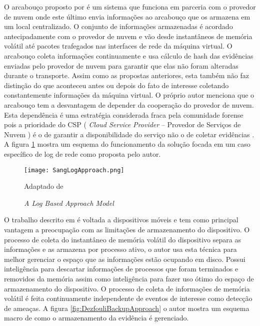 O arcabouço proposto por \cite{SangLogApproach:2013} é um sistema que funciona em parceria com o provedor de nuvem onde este último envia informações ao arcabouço que os armazena em um local centralizado.
%
O conjunto de informações armazenadas é acordado antecipadamente com o provedor de nuvem e vão desde instantâneos de memória volátil até pacotes trafegados nas interfaces de rede da máquina virtual.
%
O arcabouço coleta informações continuamente e usa cálculo de hash das evidências enviadas pelo provedor de nuvem para garantir que elas não foram alteradas durante o transporte.
%
Assim como as propostas anteriores, esta também não faz distinção do que aconteceu antes ou depois do fato de interesse coletando constantemente informações da máquina virtual.
%
O próprio autor menciona que o arcabouço tem a desvantagem de depender da cooperação do provedor de nuvem. Esta dependência é uma estratégia considerada fraca pela comunidade forense pois a prioridade do CSP ( \textit{Cloud Service Provider} -- Provedor de Serviços de Nuvem ) é o de garantir a disponibilidade do serviço não o de coletar evidências \cite{ClarkeReviewOfChallenges2015}.
%
A figura \ref{fig:SangLogApproach} mostra um esquema do funcionamento da solução focada em um caso específico de log de rede como proposta pelo autor.

\begin{figure}[htb!]
\footnotesize
\caption{\textit{A Log Based Approach Model}}
\texttt{[image: SangLogApproach.png]}
\centering
\label{fig:SangLogApproach}
\begin{center}
Adaptado de \cite{SangLogApproach:2013} 
\end{center}
\end{figure}

O trabalho descrito em \cite{DezfouliBackupApproach:2012} é voltada a dispositivos móveis e tem como principal vantagem a preocupação com as limitações de armazenamento do dispositivo.
%
O processo de coleta do instantâneo de memória volátil do dispositivo separa as informações e as armazena por processo ativo, o autor usa esta técnica para melhor gerenciar o espaço que as informações estão ocupando em disco. 
%
Possui inteligência para descartar informações de processos que foram terminados e removidos da memória assim como inteligência para fazer uso ótimo do espaço de armazenamento do dispositivo.
%
O processo de coleta de informações de memória volátil é feita continuamente independente de eventos de interesse como detecção de ameaças.
%
A figura \ref{fig:DezfouliBackupApproach} o autor mostra um esquema macro de como o armazenamento da evidência é gerenciado.

